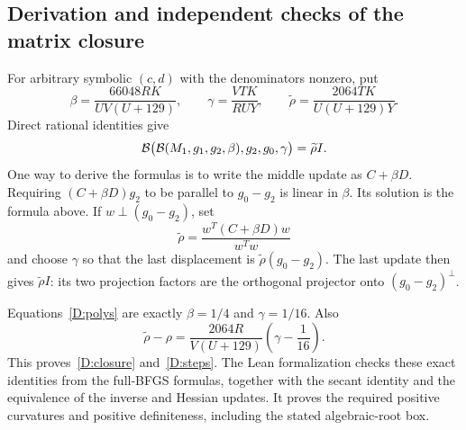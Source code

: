 

\subsection{Derivation and independent checks of the matrix closure}
For arbitrary symbolic $(c,d)$ with the denominators nonzero, put
\[
 \beta=\frac{66048RK}{UV(U+129)},\qquad
 \gamma=\frac{VTK}{RUY},\qquad
 \widetilde\rho=\frac{2064TK}{U(U+129)Y}.
\]
Direct rational identities give
\[
 \mathcal B\bigl(\mathcal B(M_1,g_1,g_2,\beta),g_2,g_0,\gamma\bigr)
 =\widetilde\rho I.
\]
One way to derive the formulas is to write the middle update as $C+\beta D$. Requiring $(C+\beta D)g_2$ to be parallel to $g_0-g_2$ is linear in $\beta$. Its solution is the formula above. If $w\perp(g_0-g_2)$, set
\[
 \widetilde\rho=\frac{w^T(C+\beta D)w}{w^Tw}
\]
and choose $\gamma$ so that the last displacement is $\widetilde\rho(g_0-g_2)$. The last update then gives $\widetilde\rho I$: its two projection factors are the orthogonal projector onto $(g_0-g_2)^\perp$.

Equations~\eqref{D:polys} are exactly $\beta=1/4$ and $\gamma=1/16$. Also
\[
 \widetilde\rho-\rho
 =\frac{2064R}{V(U+129)}\left(\gamma-\frac1{16}\right).
\]
This proves~\eqref{D:closure} and~\eqref{D:steps}. The Lean formalization checks these exact identities from the full-BFGS formulas, together with the secant identity and the equivalence of the inverse and Hessian updates. It proves the required positive curvatures and positive definiteness, including the stated algebraic-root box.


\setcounter{section}{2}
\setcounter{theorem}{1}
\setcounter{lemma}{1}
\setcounter{corollary}{0}
\setcounter{proposition}{0}
\setcounter{remark}{0}
\setcounter{equation}{6}


